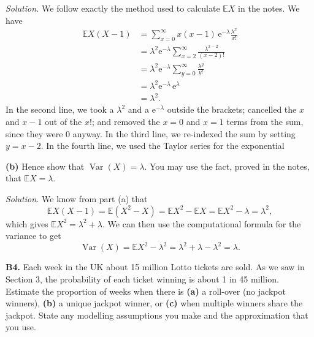 \documentclass[
  a4paper,
]{book}
\theoremstyle{definition}
\theoremstyle{definition}
\theoremstyle{definition}
\theoremstyle{definition}
\theoremstyle{remark}
\begin{document}
\begin{myanswers}
\emph{Solution.}
We follow exactly the method used to calculate \(\mathbb EX\) in the notes. We have
\begin{align*}
\mathbb EX(X-1) &= \sum_{x=0}^\infty x(x-1)\, \mathrm e^{-\lambda} \frac{\lambda^x}{x!} \\
  &= \lambda^2 \mathrm e^{-\lambda} \sum_{x=2}^\infty \frac{\lambda^{x-2}}{(x - 2)!} \\
  &= \lambda^2 \mathrm e^{-\lambda}\sum_{y=0}^\infty  \frac{\lambda^y}{y!} \\
  &= \lambda^2 \mathrm e^{-\lambda} \, \mathrm e^{\lambda} \\
  &= \lambda^2  .
\end{align*}
In the second line, we took a \(\lambda^2\) and a \(\mathrm e^{-\lambda}\) outside the brackets; cancelled the \(x\) and \(x-1\) out of the \(x!\); and removed the \(x = 0\) and \(x = 1\) terms from the sum, since they were 0 anyway. In the third line, we re-indexed the sum by setting \(y = x - 2\). In the fourth line, we used the Taylor series for the exponential

\end{myanswers}

\textbf{(b)} Hence show that \(\operatorname{Var}(X) = \lambda\). You may use the fact, proved in the notes, that \(\mathbb EX = \lambda\).

\begin{myanswers}
\emph{Solution.}
We know from part (a) that
\[ \mathbb EX(X-1) = \mathbb E(X^2 - X) = \mathbb EX^2 - \mathbb EX = \mathbb EX^2 - \lambda = \lambda^2 ,\]
which gives \(\mathbb EX^2 = \lambda^2 + \lambda\). We can then use the computational formula for the variance to get
\[ \operatorname{Var}(X) = \mathbb EX^2 - \lambda^2 = \lambda^2 + \lambda - \lambda^2 = \lambda .\]

\end{myanswers}

\textbf{B4.} Each week in the UK about 15 million Lotto tickets are sold. As we saw in Section 3, the probability of each ticket winning is about 1 in 45 million. Estimate the proportion of weeks when there is \textbf{(a)} a roll-over (no jackpot winners), \textbf{(b)} a unique jackpot winner, or \textbf{(c)} when multiple winners share the jackpot. State any modelling assumptions you make and the approximation that you use.
\end{document}
